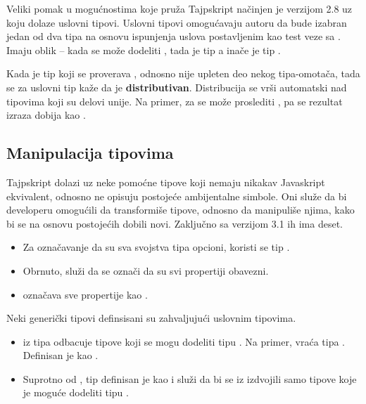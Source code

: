 Veliki pomak u mogućnostima koje pruža Tajpskript načinjen je verzijom 2.8 uz koju dolaze uslovni tipovi.
Uslovni tipovi omogućavaju autoru da bude izabran jedan od dva tipa na osnovu ispunjenja uslova postavljenim kao test veze sa .
Imaju oblik  -- kada se  može dodeliti , tada je tip  a inače je tip .

Kada je tip koji se proverava , odnosno nije upleten deo nekog tipa-omotača, tada se za uslovni tip kaže da je \textbf{distributivan}.
Distribucija se vrši automatski nad tipovima koji su delovi unije.
Na primer, za  se može proslediti , pa se rezultat izraza  dobija kao .

\subsection{Manipulacija tipovima}

Tajpskript dolazi uz neke pomoćne tipove koji nemaju nikakav Javaskript ekvivalent, odnosno ne opisuju postojeće ambijentalne simbole.
Oni služe da bi developeru omogućili da transformiše tipove, odnosno da manipuliše njima, kako bi se na osnovu postojećih dobili novi.
Zaključno sa verzijom 3.1 ih ima deset.

\begin{itemize}
\item Za označavanje da su sva svojstva tipa  opcioni, koristi se tip .
\item Obrnuto,  služi da se označi da su svi propertiji obavezni.
\item {} označava sve propertije kao .
\end{itemize}

Neki generički tipovi definsisani su zahvaljujući uslovnim tipovima.

\begin{itemize}
\item {} iz tipa  odbacuje tipove koji se mogu dodeliti tipu . Na primer,  vraća tipa . Definisan je kao .
\item Suprotno od , tip  definisan je kao  i služi da bi se iz  izdvojili samo tipove koje je moguće dodeliti tipu .
\end{itemize}

